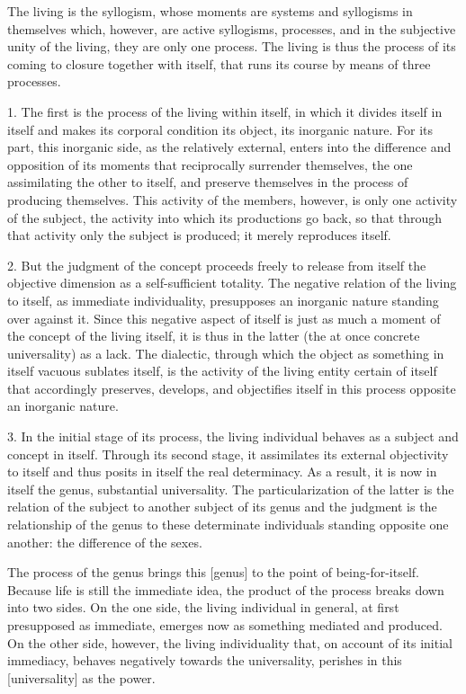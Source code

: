 The living is the syllogism, whose moments are
systems and syllogisms in themselves
which, however, are active syllogisms, processes, and
in the subjective unity of the living,
they are only one process.
The living is thus the process of
its coming to closure together with itself,
that runs its course by means of three processes.

1. The first is the process of the living within itself,
in which it divides itself in itself and makes its
corporal condition its object, its inorganic nature.
For its part, this inorganic side, as the relatively external,
enters into the difference and opposition of its moments
that reciprocally surrender themselves,
the one assimilating the other to itself,
and preserve themselves in the process of producing themselves.
This activity of the members, however, is only one activity of
the subject, the activity into which its productions go back,
so that through that activity only the subject is produced;
it merely reproduces itself.

2. But the judgment of the concept proceeds freely
to release from itself the objective dimension
as a self-sufficient totality.
The negative relation of the living to itself,
as immediate individuality,
presupposes an inorganic nature standing over against it.
Since this negative aspect of itself is just as much a moment of
the concept of the living itself, it is thus in the latter
(the at once concrete universality) as a lack.
The dialectic, through which the object as something
in itself vacuous sublates itself,
is the activity of the living entity certain of itself
that accordingly preserves, develops, and objectifies itself
in this process opposite an inorganic nature.

3. In the initial stage of its process,
the living individual behaves as
a subject and concept in itself.
Through its second stage, it assimilates
its external objectivity to itself
and thus posits in itself the real determinacy.
As a result, it is now in itself the genus,
substantial universality.
The particularization of the latter is
the relation of the subject to another subject of its genus
and the judgment is the relationship of the genus to
these determinate individuals standing opposite one another:
the difference of the sexes.

The process of the genus brings this [genus] to
the point of being-for-itself.
Because life is still the immediate idea,
the product of the process breaks down into two sides.
On the one side, the living individual in general,
at first presupposed as immediate,
emerges now as something mediated and produced.
On the other side, however, the living individuality that,
on account of its initial immediacy,
behaves negatively towards the universality,
perishes in this [universality] as the power.

